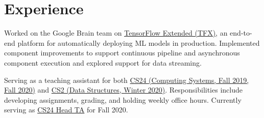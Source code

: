 \documentclass[]{deedy-resume-openfont}
\begin{document}
\hfill
\begin{minipage}[t]{0.66\textwidth} 


\section{Experience}

\vspace{\topsep} %
\vspace{1.5pt}
\begin{tightemize}\item Worked on the Google Brain team on \href{https://www.tensorflow.org/tfx}{\uline{TensorFlow Extended (TFX)}}, an end-to-end platform for automatically deploying ML models in production. Implemented component improvements to support continuous pipeline and asynchronous component execution and explored support for data streaming.
\end{tightemize}
\sectionsep
\vspace{-0.5pt}



\begin{tightemize}
\item Serving as a teaching assistant for both \uline{CS24  (Computing Systems, Fall 2019, Fall 2020)} and \uline{CS2  (Data Structures, Winter 2020)}. Responsibilities include developing assignments, grading, and holding weekly office hours. Currently serving as \uline{CS24 Head TA} for Fall 2020. \end{tightemize}
\sectionsep



\end{minipage}
\end{document}
